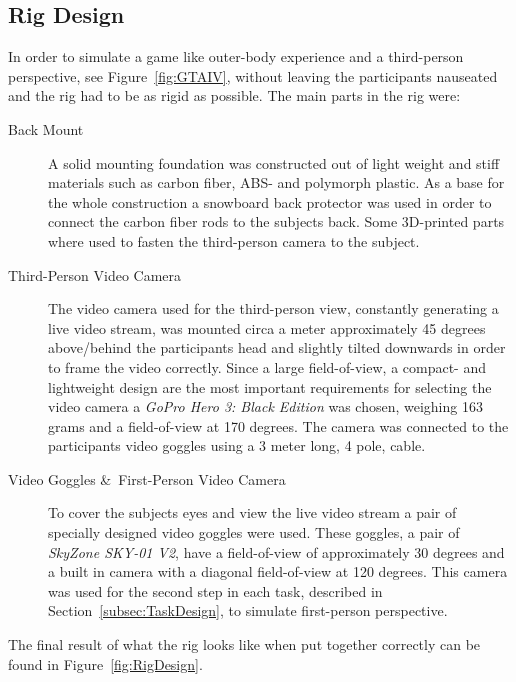 \documentclass[runningheads,a4paper,oribibl]{llncs}
\begin{document}
\subsection{Rig Design}
In order to simulate a game like outer-body experience and a third-person perspective, see Figure~\ref{fig:GTAIV}, without leaving the participants nauseated and the rig had to be as rigid as possible. The main parts in the rig were:
\begin{description}
	\item[Back Mount] A solid mounting foundation was constructed out of light weight and stiff materials such as carbon fiber, ABS- and polymorph plastic. As a base for the whole construction a snowboard back protector was used in order to connect the carbon fiber rods to the subjects back. Some 3D-printed parts where used to fasten the third-person camera to the subject.

	\item[Third-Person Video Camera] The video camera used for the third-person view, constantly generating a live video stream, was mounted circa a meter approximately 45 degrees above/behind the participants head and slightly tilted downwards in order to frame the video correctly. Since a large field-of-view, a compact- and lightweight design are the most important requirements for selecting the video camera a \emph{GoPro Hero 3: Black Edition} was chosen, weighing 163 grams and a field-of-view at 170 degrees. The camera was connected to the participants video goggles using a 3 meter long, 4 pole, cable.

	\item[Video Goggles \&\ First-Person Video Camera] To cover the subjects eyes and view the live video stream a pair of specially designed video goggles were used. These goggles, a pair of \emph{SkyZone SKY-01 V2}, have a field-of-view of approximately 30 degrees and a built in camera with a diagonal field-of-view at 120 degrees. This camera was used for the second step in each task, described in Section~\ref{subsec:TaskDesign}, to simulate first-person perspective.
\end{description}
The final result of what the rig looks like when put together correctly can be found in Figure~\ref{fig:RigDesign}.
\end{document}
